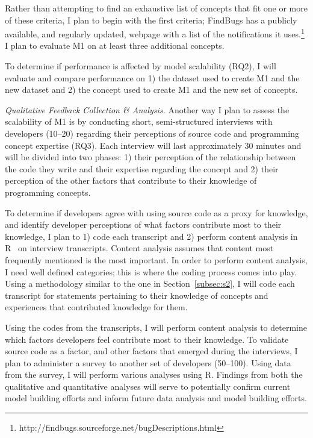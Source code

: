 \documentclass{llncs}
\begin{document}
Rather than attempting to find an exhaustive list of concepts that fit one or more of these criteria, I plan to begin with the first criteria; FindBugs has a publicly available, and regularly updated, webpage with a list of the notifications it uses.\footnote{http://findbugs.sourceforge.net/bugDescriptions.html}
I plan to evaluate M1 on at least three additional concepts.

To determine if performance is affected by model scalability (RQ2), I will evaluate and compare performance on 1) the dataset used to create M1 and the new dataset and 2) the concept used to create M1 and the new set of concepts. 

\vspace{0.5em}

\noindent\textit{Qualitative Feedback Collection \& Analysis.}
Another way I plan to assess the scalability of M1 is by conducting short, semi-structured interviews with developers (10--20) regarding their perceptions of source code and programming concept expertise (RQ3). Each interview will last approximately 30 minutes and will be divided into two phases: 1) their perception of the relationship between the code they write and their expertise regarding the concept and 2) their perception of the other factors that contribute to their knowledge of programming concepts.  

To determine if developers agree with using source code as a proxy for knowledge, and identify developer perceptions of what factors contribute most to their knowledge, I plan to 1) code each transcript and 2) perform content analysis in R~\cite{RSoftware} on interview transcripts. Content analysis assumes that content most frequently mentioned is the most important. In order to perform content analysis, I need well defined categories; this is where the coding process comes into play. Using a methodology similar to the one in Section~\ref{subsec:s2}, I will code each transcript for statements pertaining to their knowledge of concepts and experiences that contributed knowledge for them. 

Using the codes from the transcripts, I will perform content analysis to determine which factors developers feel contribute most to their knowledge.
To validate source code as a factor, and other factors that emerged during the interviews, I plan to administer a survey to another set of developers (50--100). Using data from the survey, I will perform various analyses using R. Findings from both the qualitative and quantitative analyses will serve to potentially confirm current model building efforts and inform future data analysis and model building efforts.
\end{document}
